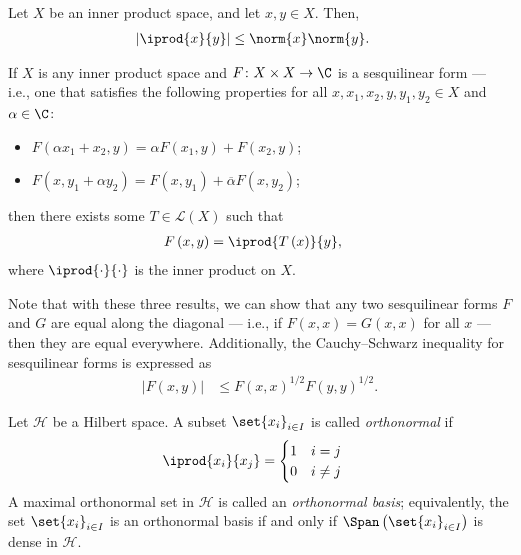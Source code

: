 \begin{theorem}
  Let $X$ be an inner product space, and let $x,y\in X$. Then,
  \begin{align*}
    \left\vert \iprod{x}{y} \right\vert &\leq \norm{x}\norm{y}.
  \end{align*}
\end{theorem}
\begin{lemma}
  If $X$ is any inner product space and $F\colon X\times X \rightarrow \C$ is a sesquilinear form --- i.e., one that satisfies the following properties for all $x,x_1,x_2,y,y_1,y_2\in X$ and $\alpha\in\C$:
  \begin{itemize}
    \item $F\left(\alpha x_1+x_2,y\right) = \alpha F\left(x_1,y\right) + F\left(x_2,y\right)$;
    \item $F\left(x,y_1 + \alpha y_2\right) = F\left(x,y_1\right) + \overline{\alpha}F\left(x,y_2\right)$;
  \end{itemize}
  then there exists some $T\in \mathcal{L}\left(X\right)$ such that
  \begin{align*}
    F\left(x,y\right) &= \iprod{T\left(x\right)}{y},
  \end{align*}
  where $ \iprod{\cdot}{\cdot} $ is the inner product on $X$.
\end{lemma}
\begin{remark}
Note that with these three results, we can show that any two sesquilinear forms $F$ and $G$ are equal along the diagonal --- i.e., if $F(x,x) = G(x,x)$ for all $x$ --- then they are equal everywhere. Additionally, the Cauchy--Schwarz inequality for sesquilinear forms is expressed as
\begin{align*}
  \left\vert F\left(x,y\right) \right\vert &\leq F\left(x,x\right)^{1/2}F\left(y,y\right)^{1/2}.
\end{align*}

\end{remark}
\begin{definition}
  Let $\mathcal{H}$ be a Hilbert space. A subset $\set{x_i}_{i\in I}$ is called \textit{orthonormal} if 
  \begin{align*}
    \iprod{x_i}{x_j} &= \begin{cases}
      1 & i=j\\
      0 & i\neq j
    \end{cases}
  \end{align*}
  A maximal orthonormal set in $\mathcal{H}$ is called an \textit{orthonormal basis}; equivalently, the set $\set{x_i}_{i\in I}$ is an orthonormal basis if and only if $\Span\left(\set{x_i}_{i\in I}\right)$ is dense in $\mathcal{H}$.
\end{definition}
